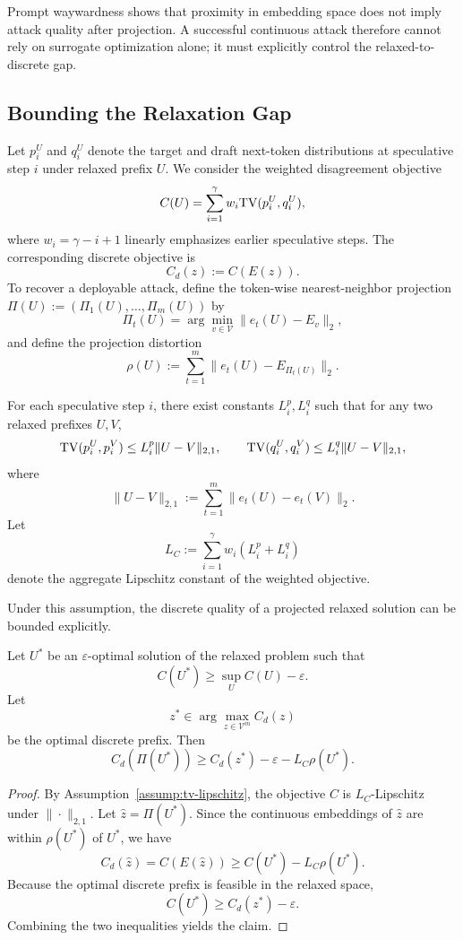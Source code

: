 Prompt waywardness shows that proximity in embedding space does not imply
attack quality after projection. A successful continuous attack therefore
cannot rely on surrogate optimization alone; it must explicitly control the
relaxed-to-discrete gap.

\subsection{Bounding the Relaxation Gap}

Let $p_i^U$ and $q_i^U$ denote the target and draft next-token distributions at
speculative step $i$ under relaxed prefix $U$. We consider the weighted
disagreement objective
\[
C(U) = \sum_{i=1}^{\gamma} w_i \mathrm{TV}(p_i^U, q_i^U),
\]
where $w_i = \gamma - i + 1$ linearly emphasizes earlier speculative steps.
The corresponding discrete objective is
\[
C_d(z) := C(E(z)).
\]
To recover a deployable attack, define the token-wise nearest-neighbor
projection $\Pi(U) := (\Pi_1(U), \dots, \Pi_m(U))$ by
\[
\Pi_t(U) = \arg\min_{v \in \mathcal{V}} \|e_t(U) - E_v\|_2,
\]
and define the projection distortion
\[
\rho(U) := \sum_{t=1}^{m} \|e_t(U) - E_{\Pi_t(U)}\|_2.
\]

\begin{assumption}[TV-Lipschitzness]
\label{assump:tv-lipschitz}
For each speculative step $i$, there exist constants $L_i^p, L_i^q$ such that
for any two relaxed prefixes $U, V$,
\[
\mathrm{TV}(p_i^U, p_i^V) \le L_i^p \|U - V\|_{2,1},
\qquad
\mathrm{TV}(q_i^U, q_i^V) \le L_i^q \|U - V\|_{2,1},
\]
where
\[
\|U - V\|_{2,1} := \sum_{t=1}^{m} \|e_t(U) - e_t(V)\|_2.
\]
Let
\[
L_C := \sum_{i=1}^{\gamma} w_i (L_i^p + L_i^q)
\]
denote the aggregate Lipschitz constant of the weighted objective.
\end{assumption}

Under this assumption, the discrete quality of a projected relaxed solution can
be bounded explicitly.

\begin{theorem}
\label{thm:relax-gap}
Let $U^*$ be an $\varepsilon$-optimal solution of the relaxed problem such that
\[
C(U^*) \ge \sup_U C(U) - \varepsilon.
\]
Let
\[
z^* \in \arg\max_{z \in \mathcal{V}^m} C_d(z)
\]
be the optimal discrete prefix. Then
\[
C_d(\Pi(U^*)) \ge C_d(z^*) - \varepsilon - L_C \rho(U^*).
\]
\end{theorem}

\begin{proof}
By Assumption~\ref{assump:tv-lipschitz}, the objective $C$ is $L_C$-Lipschitz
under $\|\cdot\|_{2,1}$. Let $\hat{z} = \Pi(U^*)$. Since the continuous
embeddings of $\hat{z}$ are within $\rho(U^*)$ of $U^*$, we have
\[
C_d(\hat{z}) = C(E(\hat{z})) \ge C(U^*) - L_C \rho(U^*).
\]
Because the optimal discrete prefix is feasible in the relaxed space,
\[
C(U^*) \ge C_d(z^*) - \varepsilon.
\]
Combining the two inequalities yields the claim.
\end{proof}

